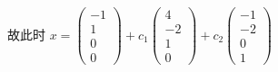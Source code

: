 \begin{enumerate}
			       故此时 \( x = \begin{pmatrix}
				       -1 \\
				       1  \\
				       0  \\
				       0
			       \end{pmatrix} + c_{1}\begin{pmatrix}
				       4  \\
				       -2 \\
				       1  \\
				       0
			       \end{pmatrix} + c_{2}\begin{pmatrix}
				       -1 \\
				       -2 \\
				       0  \\
				       1
			       \end{pmatrix} \)
		 \end{enumerate}


